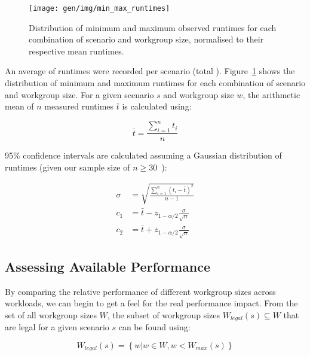 \begin{figure}
\centering
\texttt{[image: gen/img/min\_max\_runtimes]}
\caption{%
  Distribution of minimum and maximum observed runtimes for each
  combination of scenario and workgroup size, normalised to their
  respective mean runtimes. %
}
\label{fig:min-max-runtimes}
\end{figure}

An average of  runtimes were recorded per
scenario (total
). Figure~\ref{fig:min-max-runtimes} shows the
distribution of minimum and maximum runtimes for each combination of
scenario and workgroup size. For a given scenario $s$ and workgroup
size $w$, the arithmetic mean of $n$ measured runtimes $\bar{t}$ is
calculated using:

\begin{equation}
\bar{t} = \frac{\sum_{i=1}^{n}t_i}{n}
\end{equation}

95\% confidence intervals are calculated assuming a Gaussian
distribution of runtimes (given our sample size of
$n \ge 30$~\cite{Georges2007}):

\begin{align}
\sigma &= \sqrt{\frac{\sum_{i=1}^{n}(t_i - \bar{t})^2}{n - 1}}\\
c_1 &= \bar{t} - z_{1-\alpha/2}\frac{\sigma}{\sqrt{n}}\\
c_2 &= \bar{t} + z_{1-\alpha/2}\frac{\sigma}{\sqrt{n}}
\end{align}



\subsection{Assessing Available Performance}

By comparing the relative performance of different workgroup sizes
across workloads, we can begin to get a feel for the real performance
impact. From the set of all workgroup sizes $W$, the subset of
workgroup sizes $W_{legal}(s) \subseteq W$ that are legal for a given
scenario $s$ can be found using:

\begin{equation}
W_{legal}(s) = \left\{w | w \in W, w < W_{max}(s) \right\}
\end{equation}

